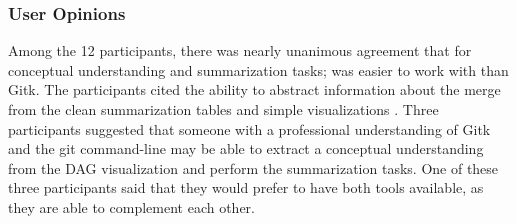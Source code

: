 \subsubsection{User Opinions}
\label{sub:user_opinions}

Among the 12 participants, there was nearly unanimous agreement that for
conceptual understanding and summarization tasks; \tool was easier to
work with  than Gitk. The participants cited the ability to abstract
information about the merge from the clean summarization tables and
simple visualizations . Three participants suggested that someone with a
professional understanding of Gitk and the git command-line may be able to
extract a conceptual understanding from the DAG visualization and
perform the summarization tasks. One of these three participants said
that they would prefer to have both tools available, as they are able to
complement each other.

